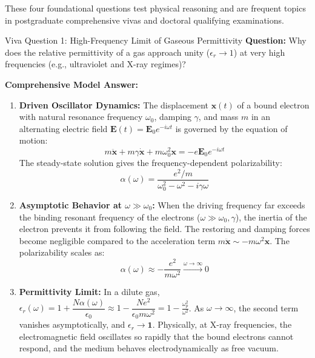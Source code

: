 \documentclass[11pt,a4paper]{article}
\begin{document}
These four foundational questions test physical reasoning and are frequent topics in postgraduate comprehensive vivas and doctoral qualifying examinations.

\begin{checkpointbox}{Viva Question 1: High-Frequency Limit of Gaseous Permittivity}
\textbf{Question:} Why does the relative permittivity of a gas approach unity ($\epsilon_r \to 1$) at very high frequencies (e.g., ultraviolet and X-ray regimes)?

\textbf{Comprehensive Model Answer:}
\begin{enumerate}[leftmargin=*]
    \item \textbf{Driven Oscillator Dynamics:}
    The displacement $\mathbf{x}(t)$ of a bound electron with natural resonance frequency $\omega_0$, damping $\gamma$, and mass $m$ in an alternating electric field $\mathbf{E}(t) = \mathbf{E}_0 e^{-i\omega t}$ is governed by the equation of motion:
    \begin{equation*}
        m\ddot{\mathbf{x}} + m\gamma\dot{\mathbf{x}} + m\omega_0^2\mathbf{x} = -e\mathbf{E}_0 e^{-i\omega t}
    \end{equation*}
    The steady-state solution gives the frequency-dependent polarizability:
    \begin{equation*}
        \alpha(\omega) = \frac{e^2/m}{\omega_0^2 - \omega^2 - i\gamma\omega}
    \end{equation*}
    \item \textbf{Asymptotic Behavior at $\omega \gg \omega_0$:}
    When the driving frequency far exceeds the binding resonant frequency of the electrons ($\omega \gg \omega_0, \gamma$), the inertia of the electron prevents it from following the field. The restoring and damping forces become negligible compared to the acceleration term $m\ddot{\mathbf{x}} \sim -m\omega^2 \mathbf{x}$. The polarizability scales as:
    \begin{equation*}
        \alpha(\omega) \approx -\frac{e^2}{m\omega^2} \xrightarrow{\omega \to \infty} 0
    \end{equation*}
    \item \textbf{Permittivity Limit:}
    In a dilute gas, $\epsilon_r(\omega) = 1 + \dfrac{N\alpha(\omega)}{\epsilon_0} \approx 1 - \dfrac{N e^2}{\epsilon_0 m \omega^2} = 1 - \frac{\omega_p^2}{\omega^2}$.
    As $\omega \to \infty$, the second term vanishes asymptotically, and $\epsilon_r \to \mathbf{1}$. Physically, at X-ray frequencies, the electromagnetic field oscillates so rapidly that the bound electrons cannot respond, and the medium behaves electrodynamically as free vacuum.
\end{enumerate}
\end{checkpointbox}
\end{document}
